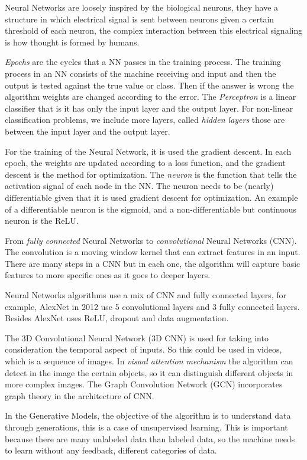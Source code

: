 \documentclass[9pt,a4paper]{article}
\begin{document}
Neural Networks are loosely inspired by the biological neurons, they have a structure in which electrical signal is sent between neurons given a certain threshold of each neuron, the complex interaction between this electrical signaling is how thought is formed by humans. 

\textit{Epochs} are the cycles that a NN passes in the training process. The training process in an NN consists of the machine receiving and input and then the output is tested against the true value or class. Then if the answer is wrong the algorithm weights are changed according to the error.
The \textit{Perceptron} is a linear classifier that is it has only the input layer and the output layer. For non-linear classification problems, we include more layers, called \textit{hidden layers} those are between the input layer and the output layer.

For the training of the Neural Network, it is used the gradient descent. In each epoch, the weights are updated according to a loss function, and the gradient descent is the method for optimization. The \textit{neuron} is the function that tells the activation signal of each node in the NN. The neuron needs to be (nearly) differentiable given that it is used gradient descent for optimization. An example of a differentiable neuron is the sigmoid, and a non-differentiable but continuous neuron is the ReLU.


From \textit{fully connected} Neural Networks to \textit{convolutional} Neural Networks (CNN). The convolution is a moving window kernel that can extract features in an input. There are many steps in a CNN but in each one, the algorithm will capture basic features to more specific ones as it goes to deeper layers.

Neural Networks algorithms use a mix of CNN and fully connected layers, for example, AlexNet in 2012 use 5 convolutional layers and 3 fully connected layers. Besides AlexNet uses ReLU, dropout and data augmentation.

The 3D Convolutional Neural Network (3D CNN) is used for taking into consideration the temporal aspect of inputs. So this could be used in videos, which is a sequence of images. In \textit{visual attention mechanism} the algorithm can detect in the image the certain objects, so it can distinguish different objects in more complex images.
The Graph Convolution Network (GCN) incorporates graph theory in the architecture of CNN.

In the Generative Models, the objective of the algorithm is to understand data through generations, this is a case of unsupervised learning. This is important because there are many unlabeled data than labeled data, so the machine needs to learn without any feedback, different categories of data.
\end{document}
